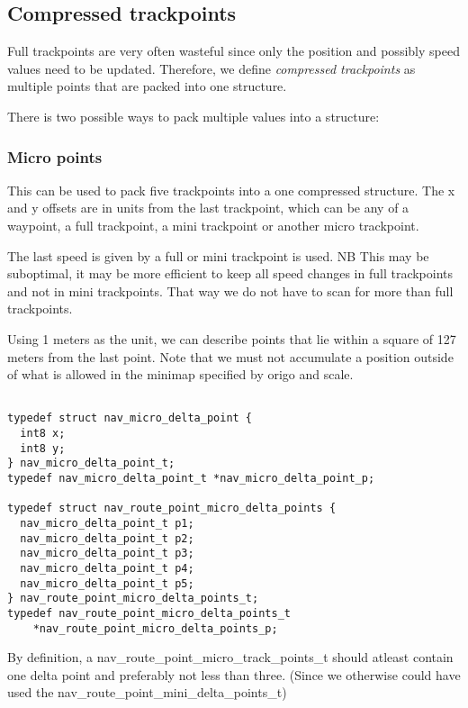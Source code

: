\documentclass[a4paper]{article}
\begin{document}
\subsection{Compressed trackpoints}

Full trackpoints are very often wasteful since only the position
and possibly speed values need to be updated. Therefore, we define 
{\em compressed trackpoints}
as multiple points that are packed into one structure.

There is two possible ways to pack multiple values into a structure:

\subsubsection{Micro points}

  This can be used to pack five trackpoints
  into a one compressed structure. The x and y offsets
  are in units from the last trackpoint, which can be any
  of a waypoint, a full trackpoint, a mini trackpoint or 
  another micro trackpoint.

  The last speed is given by a full or mini trackpoint is used.
  NB This may be suboptimal, it may be more efficient to keep
  all speed changes in full trackpoints and not in mini trackpoints.
  That way we do not have to scan for more than full trackpoints.

  Using 1 meters as the unit, we can describe points
  that lie within a square of 127 meters from the
  last point. Note that we must not accumulate a position outside
  of what is allowed in the minimap specified by origo and scale.

\begin{verbatim}

typedef struct nav_micro_delta_point {
  int8 x;
  int8 y;
} nav_micro_delta_point_t;
typedef nav_micro_delta_point_t *nav_micro_delta_point_p;

typedef struct nav_route_point_micro_delta_points {
  nav_micro_delta_point_t p1;
  nav_micro_delta_point_t p2;
  nav_micro_delta_point_t p3;
  nav_micro_delta_point_t p4;
  nav_micro_delta_point_t p5;
} nav_route_point_micro_delta_points_t;
typedef nav_route_point_micro_delta_points_t
    *nav_route_point_micro_delta_points_p;

\end{verbatim}

By definition, a nav\_route\_point\_micro\_track\_points\_t should
atleast contain one delta point and preferably not less than three.
(Since we otherwise could have used the
nav\_route\_point\_mini\_delta\_points\_t)
\end{document}
